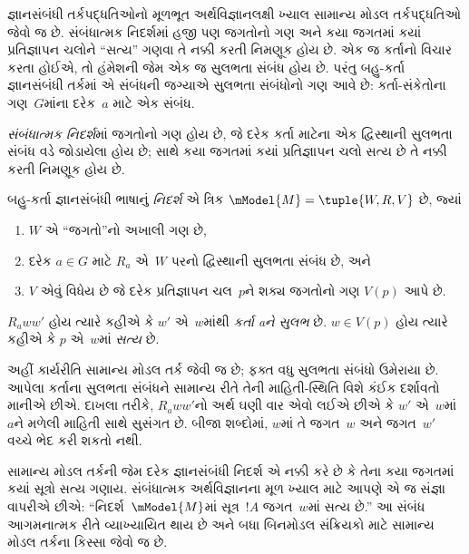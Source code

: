 \begingroup
\makeatletter{}\makeatother


\label{guunit:OLP-0485}


જ્ઞાનસંબંધી તર્કપદ્ધતિઓનો મૂળભૂત અર્થવિજ્ઞાનલક્ષી ખ્યાલ સામાન્ય
મોડલ તર્કપદ્ધતિઓ જેવો જ છે. સંબંધાત્મક નિદર્શમાં હજી પણ જગતોનો
ગણ અને કયા જગતમાં કયાં પ્રતિજ્ઞાપન ચલોને ``સત્ય'' ગણવા તે નક્કી કરતી નિમણૂક હોય છે. એક જ
કર્તાનો વિચાર કરતા હોઈએ, તો હંમેશની જેમ એક જ સુલભતા સંબંધ
હોય છે. પરંતુ બહુ-કર્તા જ્ઞાનસંબંધી તર્કમાં એ સંબંધની જગ્યાએ
સુલભતા સંબંધોનો ગણ આવે છે: કર્તા-સંકેતોના ગણ~$G$માંના દરેક~$a$
માટે એક સંબંધ.

\emph{સંબંધાત્મક નિદર્શ}માં જગતોનો ગણ હોય છે, જે દરેક કર્તા
માટેના એક દ્વિસ્થાની સુલભતા સંબંધ વડે જોડાયેલા હોય છે; સાથે
કયા જગતમાં કયાં પ્રતિજ્ઞાપન ચલો સત્ય છે તે નક્કી
કરતી નિમણૂક હોય છે.

\begin{defn}
  બહુ-કર્તા જ્ઞાનસંબંધી ભાષાનું \emph{નિદર્શ} એ ત્રિક
  $\mModel{M} = \tuple{W, R, V}$ છે, જ્યાં
  \begin{enumerate}
  \item $W$ એ ``જગતો''નો અખાલી ગણ છે,
  \item દરેક $a \in G$ માટે ${R}_a$ એ~$W$ પરનો દ્વિસ્થાની
  સુલભતા સંબંધ છે, અને
  \item $V$ એવું વિધેય છે જે દરેક પ્રતિજ્ઞાપન ચલ~$p$ને શક્ય જગતોનો ગણ $V(p)$ આપે છે.
  \end{enumerate}
  $R_a ww'$ હોય ત્યારે કહીએ કે $w'$ એ~$w$માંથી
  \emph{કર્તા aને સુલભ} છે. $w \in V(p)$ હોય ત્યારે કહીએ કે
  $p$ એ~$w$માં \emph{સત્ય} છે.
\end{defn}

અહીં કાર્યરીતિ સામાન્ય મોડલ તર્ક જેવી જ છે; ફક્ત વધુ સુલભતા
સંબંધો ઉમેરાયા છે. આપેલા કર્તાના સુલભતા સંબંધને સામાન્ય રીતે
તેની માહિતી-સ્થિતિ વિશે કંઈક દર્શાવતો માનીએ છીએ. દાખલા તરીકે,
$R_a ww'$નો અર્થ ઘણી વાર એવો લઈએ છીએ કે $w'$ એ~$w$માં~$a$ને
મળેલી માહિતી સાથે સુસંગત છે. બીજા શબ્દોમાં, $w$માં તે
જગત~$w$ અને જગત~$w'$ વચ્ચે ભેદ કરી શકતો નથી.
\endgroup

\begingroup
\makeatletter{}\makeatother


\label{guunit:OLP-0486}


સામાન્ય મોડલ તર્કની જેમ દરેક જ્ઞાનસંબંધી નિદર્શ એ નક્કી કરે છે કે
તેના કયા જગતમાં કયાં સૂત્રો સત્ય ગણાય. સંબંધાત્મક
અર્થવિજ્ઞાનના મૂળ ખ્યાલ માટે આપણે એ જ સંજ્ઞા વાપરીએ છીએ:
``નિદર્શ~$\mModel{M}$માં સૂત્ર~$!A$ જગત~$w$માં સત્ય છે.''
આ સંબંધ આગમનાત્મક રીતે વ્યાખ્યાયિત થાય છે અને બધા બિનમોડલ
સંક્રિયકો માટે સામાન્ય મોડલ તર્કના કિસ્સા જેવો જ છે.


